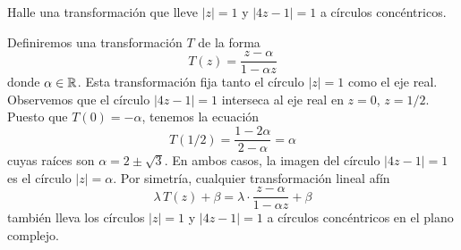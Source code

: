\begin{exercise}
Halle una transformación que lleve $|z| = 1$ y $|4z - 1| = 1$ a círculos concéntricos.
\end{exercise}

\begin{solution}
Definiremos una transformación $T$ de la forma
$$T(z) = \frac {z - \alpha} {1 - \alpha z}$$
donde $\alpha \in \mathbb R$. Esta transformación fija tanto el círculo $|z| = 1$ como el eje real. Observemos que el círculo $|4z - 1| = 1$ interseca al eje real en $z = 0$, $z = 1/2$. Puesto que $T(0) = -\alpha$, tenemos la ecuación
$$T(1/2) = \frac {1 - 2\alpha} {2 - \alpha} = \alpha$$
cuyas raíces son $\alpha = 2 \pm \sqrt 3$. En ambos casos, la imagen del círculo $|4z - 1| = 1$ es el círculo $|z| = \alpha$. Por simetría, cualquier transformación lineal afín
$$\lambda \, T(z) + \beta = \lambda \cdot \frac {z - \alpha} {1 - \alpha z} + \beta$$
también lleva los círculos $|z| = 1$ y $|4z - 1| = 1$ a círculos concéntricos en el plano complejo.
\end{solution}
